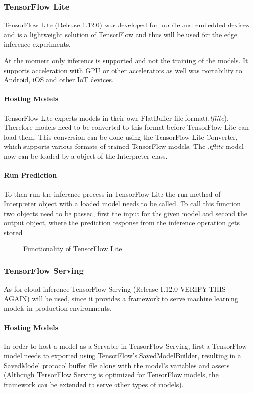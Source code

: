 \subsubsection{TensorFlow Lite}
TensorFlow Lite (Release 1.12.0) was developed for mobile and embedded devices and is a lightweight solution of TensorFlow and thus will be used for the edge inference experiments.


At the moment only inference is supported and not the training of the models.
It supports acceleration with GPU or other accelerators as well was portability to Android, iOS and other IoT devices.



\paragraph{Hosting Models}
TensorFlow Lite expects models in their own FlatBuffer file  format(\emph{.tflite}). Therefore models need to be converted to this format before TensorFlow Lite can load them. This conversion can be done using the TensorFlow Lite Converter, which supports various formats of trained TensorFlow models.
The \emph{.tflite} model now can be loaded by a object of the Interpreter class.
\paragraph{Run Prediction}
To then run the inference process in TensorFlow Lite the run method of Interpreter object with a loaded model needs to be called. To call this function two objects need to be passed, first the input for the given model and second the output object, where the prediction response from the inference operation gets stored. 
\begin{figure}[H]
\centering

\caption{Functionality of TensorFlow Lite}
\label{fig:edge}
\end{figure}
\subsubsection{TensorFlow Serving}
As for cloud inference TensorFlow Serving (Release 1.12.0 VERIFY THIS AGAIN) will be used, since it provides a framework to serve machine learning models in production environments. 



\paragraph{Hosting Models}
In order to host a model as a Servable in TensorFlow Serving, first a TensorFlow model needs to exported using TensorFlow's SavedModelBuilder, resulting in a SavedModel protocol buffer file along with the model’s variables and assets (Although TensorFlow Serving is optimized for TensorFlow models, the framework can be extended to serve other types of models).

